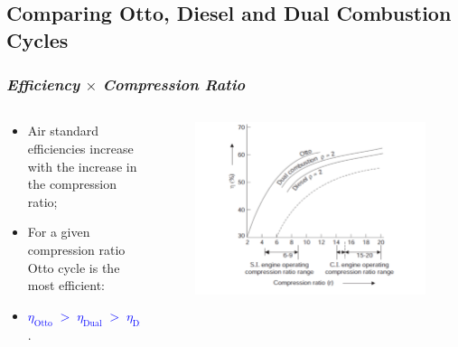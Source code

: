\documentclass[10pt,compress]{beamer}
\begin{document}
\subsection{Comparing Otto, Diesel and Dual Combustion Cycles}
\begin{frame}
 \frametitle{{\it Efficiency} $\times$ {\it Compression Ratio}}
  \begin{columns}
   \begin{column}[c]{0.4\linewidth}
    \begin{itemize}
     \item <1-> Air standard efficiencies increase with the increase in the compression ratio;
     \item <2-> For a given compression ratio Otto cycle is the most efficient:
     \item <3-> \textcolor{blue}{$\eta_{\text{Otto}} \; > \; \eta_{\text{Dual}} \; > \; \eta_{\text{Diesel}}$}.
    \end{itemize}
   \end{column}
   \begin{column}[c]{0.6\linewidth}
    \begin{figure}%
     \begin{center}
      \includegraphics[width=7.cm,clip]{./Pics/InternalCombustion_Comparison1}
     \end{center}
    \end{figure}   
   \end{column}  
  \end{columns}
\end{frame}
\end{document}
